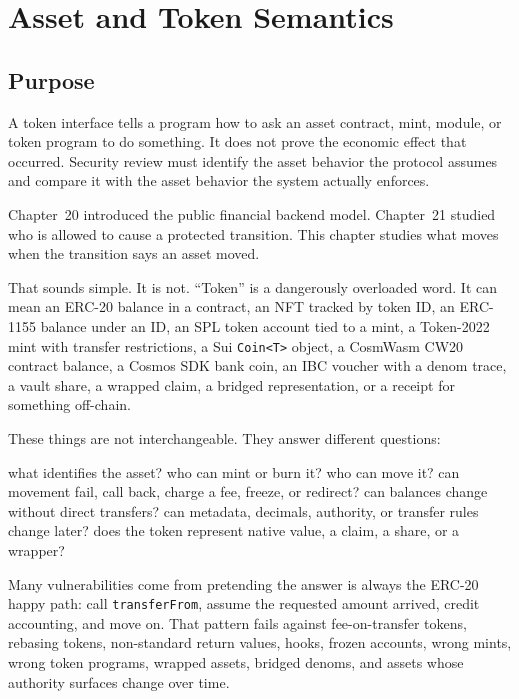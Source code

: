 \chapter{Asset and Token Semantics}

\section{Purpose}

\begin{principlebox}
A token interface tells a program how to ask an asset contract, mint, module, or token program to do something. It does not prove the economic effect that occurred. Security review must identify the asset behavior the protocol assumes and compare it with the asset behavior the system actually enforces.
\end{principlebox}

Chapter~20 introduced the public financial backend model. Chapter~21 studied who is allowed to cause a protected transition. This chapter studies what moves when the transition says an asset moved.

That sounds simple. It is not. ``Token'' is a dangerously overloaded word. It can mean an ERC-20 balance in a contract, an NFT tracked by token ID, an ERC-1155 balance under an ID, an SPL token account tied to a mint, a Token-2022 mint with transfer restrictions, a Sui \texttt{Coin<T>} object, a CosmWasm CW20 contract balance, a Cosmos SDK bank coin, an IBC voucher with a denom trace, a vault share, a wrapped claim, a bridged representation, or a receipt for something off-chain.

These things are not interchangeable. They answer different questions:

\begin{codeblock}
what identifies the asset?
who can mint or burn it?
who can move it?
can movement fail, call back, charge a fee, freeze, or redirect?
can balances change without direct transfers?
can metadata, decimals, authority, or transfer rules change later?
does the token represent native value, a claim, a share, or a wrapper?
\end{codeblock}

Many vulnerabilities come from pretending the answer is always the ERC-20 happy path: call \texttt{transferFrom}, assume the requested amount arrived, credit accounting, and move on. That pattern fails against fee-on-transfer tokens, rebasing tokens, non-standard return values, hooks, frozen accounts, wrong mints, wrong token programs, wrapped assets, bridged denoms, and assets whose authority surfaces change over time.

